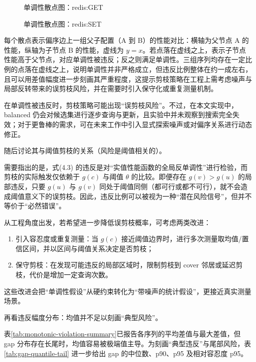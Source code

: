 \documentclass[UTF8,a4paper,12pt]{ctexart}
\numberwithin{equation}{section}
\begin{document}
\begin{figure}
  \centering
  
  \caption{单调性散点图：redis:GET}
  \label{fig:hypothesis-redis-get}
\end{figure}

\begin{figure}
  \centering
  
  \caption{单调性散点图：redis:SET}
  \label{fig:hypothesis-redis-set}
\end{figure}

每个散点表示偏序边上一组父子配置（A 到
B）的性能对比：横轴为父节点 A 的性能，纵轴为子节点 B 的性能，虚线为
\(y=x\)。若点落在虚线之上，表示子节点性能高于父节点，对应单调性被违反；反之则满足单调性。三组序列均存在一定比例的点落在虚线之上，说明单调性并非严格成立，但违反比例整体在约一成左右，且可以用差值幅度进一步刻画其严重程度，这提示剪枝策略在工程上需考虑噪声与局部反转带来的误剪枝风险，并在需要时引入保守化或重复测量机制。

在单调性被违反时，剪枝策略可能出现``误剪枝风险''。不过，在本文实现中，balanced
仍会对候选集进行逐步查询与更新，且实验中并未观察到搜索完全失效；对于更鲁棒的需求，可在未来工作中引入显式探索噪声或对偏序关系进行动态修正。

随后讨论其与阈值剪枝的关系（风险是阈值相关的）。

需要指出的是，式(4.3)
的违反是对``实值性能函数的全局反单调性''进行检验，而剪枝的实际触发仅依赖于
\(g(c)\) 与阈值 \(\theta\) 的比较。即便存在 \(g(v)>g(u)\)
的局部违反，只要 \(g(u)\) 与 \(g(v)\)
同处于阈值同侧（都可行或都不可行），就不会造成阈值意义下的误剪枝。因此，违反比例可以被视为一种``潜在风险信号''，但并不等价于``必然错误''。

从工程角度出发，若希望进一步降低误剪枝概率，可考虑两类改进：
\begin{enumerate}
\def\labelenumi{\arabic{enumi}.}
\item
  引入容忍度或重复测量：当 \(g(c)\)
  接近阈值边界时，进行多次测量取均值/置信区间，并以区间与阈值关系决定是否剪枝；
\item
  保守剪枝：在发现可能违反的局部区域时，限制剪枝到 cover
  邻居或延迟剪枝，代价是增加一定查询次数。
\end{enumerate}

这些改进会把``单调性假设''从硬约束转化为``带噪声的统计假设''，更接近真实测量场景。

再看违反幅度分布：均值并不足以刻画``典型风险''。

表\ref{tab:monotonic-violation-summary}已报告各序列的平均差值与最大差值，但 gap 分布存在长尾时，均值容易被极端值主导。为刻画``典型违反''与尾部风险，表\ref{tab:gap-quantile-tail} 进一步给出 gap 的中位数、p90、p95 及相对容忍度 p95。
\end{document}
